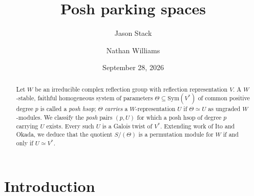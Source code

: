 \documentclass[11pt]{amsart}
\title{Posh parking spaces}
\author{Jason Stack}
\author{Nathan Williams}
\date{September 28, 2026}
\theoremstyle{definition}
\begin{document}
\begin{abstract}
Let $W$ be an
irreducible complex reflection group with reflection representation $V$.  A $W$-stable, faithful homogeneous system of
parameters $\Theta \subseteq \mathrm{Sym}(V^*)$ of common positive degree $p$ is called a \emph{posh hsop}; $\Theta$ \emph{carries} a $W$-representation $U$ if $\Theta \simeq U$ as ungraded $W$-modules. We classify the \emph{posh} pairs $(p,U)$ for which a posh hsop of degree $p$ carrying $U$ exists. Every such $U$ is a Galois twist of $V^*$. Extending work of Ito and Okada, we deduce that the quotient $S/(\Theta)$ is a permutation module for $W$ if and only if $U \simeq V^*$.
\end{abstract}
\maketitle
\section{Introduction}
\end{document}
